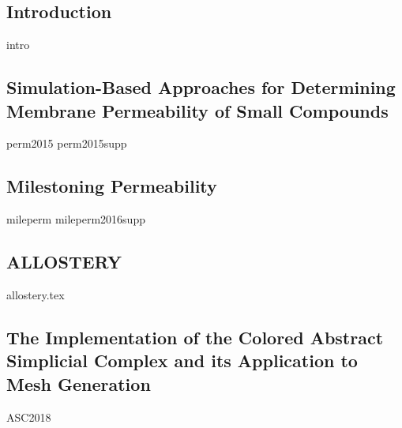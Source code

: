 \documentclass[11pt, chapterheads, final]{ucsd}
\theoremstyle{definition}
\begin{document}
%


\begin{refsection}
\chapter{Introduction}
{intro}
\printbibliography[segment=\therefsegment,heading=subbibintoc]{}
\end{refsection}

\newpage
\begin{refsection}
\chapter{Simulation-Based Approaches for Determining Membrane Permeability of Small Compounds}\label{chap:permeability}
{perm2015}
{perm2015supp}
\printbibliography[segment=\therefsegment,heading=subbibintoc]{}
\end{refsection}

\newpage
\begin{refsection}
\chapter{Milestoning Permeability}\label{chap:mileperm}
{mileperm}
{mileperm2016supp}
\printbibliography[segment=\therefsegment,heading=subbibintoc]{}
\end{refsection}

\newpage
\begin{refsection}
\chapter{ALLOSTERY}\label{chap:allostery}
{allostery.tex}
\printbibliography[segment=\therefsegment,heading=subbibintoc]{}
\end{refsection}

\newpage
\begin{refsection}
\chapter{The Implementation of the Colored Abstract Simplicial Complex and its Application to Mesh Generation}\label{chap:asc}
{ASC2018}
\printbibliography[segment=\therefsegment,heading=subbibintoc]{}
\end{refsection}
\end{document}
